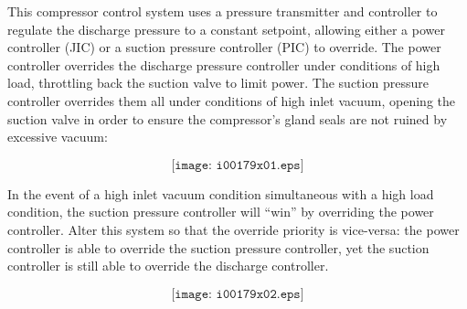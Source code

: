 

This compressor control system uses a pressure transmitter and controller to regulate the discharge pressure to a constant setpoint, allowing either a power controller (JIC) or a suction pressure controller (PIC) to override.  The power controller overrides the discharge pressure controller under conditions of high load, throttling back the suction valve to limit power.  The suction pressure controller overrides them all under conditions of high inlet vacuum, opening the suction valve in order to ensure the compressor's gland seals are not ruined by excessive vacuum:

$$\texttt{[image: i00179x01.eps]}$$

In the event of a high inlet vacuum condition simultaneous with a high load condition, the suction pressure controller will ``win'' by overriding the power controller.  Alter this system so that the override priority is vice-versa: the power controller is able to override the suction pressure controller, yet the suction controller is still able to override the discharge controller.







$$\texttt{[image: i00179x02.eps]}$$










